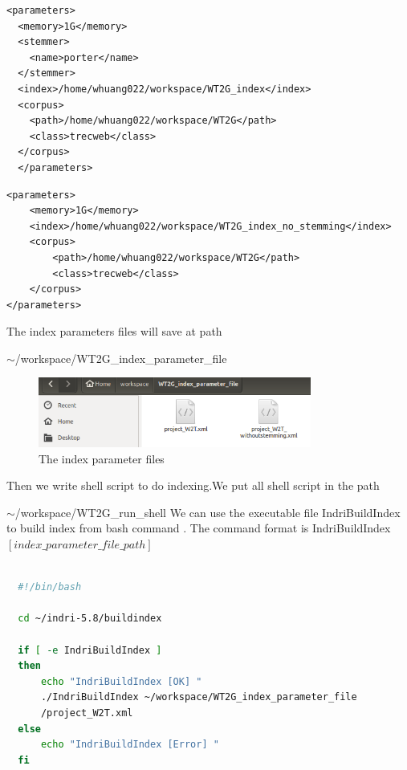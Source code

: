 \documentclass{article}
\begin{document}
\lstset{language=XML}
\begin{lstlisting}[caption={project\_W2T.xml}]
  <parameters>
  <memory>1G</memory>   
  <stemmer>
    <name>porter</name>
  </stemmer> 
  <index>/home/whuang022/workspace/WT2G_index</index>
  <corpus>
    <path>/home/whuang022/workspace/WT2G</path>
    <class>trecweb</class>
  </corpus>
  </parameters>
\end{lstlisting}

\lstset{language=XML}
\begin{lstlisting}[caption={project\_W2T\_withoutstemming.xml}]
  <parameters>
	<memory>1G</memory>   
	<index>/home/whuang022/workspace/WT2G_index_no_stemming</index>
	<corpus>
		<path>/home/whuang022/workspace/WT2G</path>
		<class>trecweb</class>
	</corpus>
</parameters>
\end{lstlisting}
The index parameters files will save at path 

$\sim$/workspace/WT2G\_index\_parameter\_file

\begin{figure}[H]
  \begin{center}
  \includegraphics[width=0.8\textwidth]{image/index_par_folder.png}
  \caption{The index parameter files}
  \label{fig:env_06}
  \end{center}
\end{figure}

Then we write shell script to do indexing.We put all shell script in the path 

$\sim$/workspace/WT2G\_run\_shell
\newline\newline
We can use the executable file IndriBuildIndex to build index from bash command .
The command format is IndriBuildIndex $\left[index\_parameter\_file\_path\right]$
\begin{lstlisting}[language=bash,caption={index.sh (use porter stemming)}]

  #!/bin/bash

  cd ~/indri-5.8/buildindex
  
  if [ -e IndriBuildIndex ]
  then
      echo "IndriBuildIndex [OK] "
      ./IndriBuildIndex ~/workspace/WT2G_index_parameter_file
      /project_W2T.xml
  else
      echo "IndriBuildIndex [Error] "
  fi  

\end{lstlisting}
\end{document}
